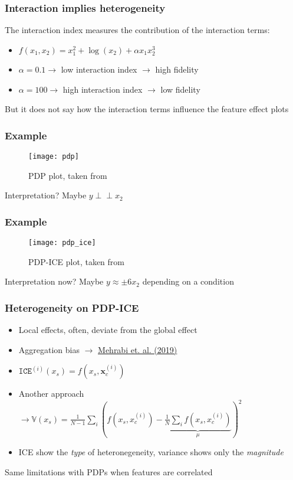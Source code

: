 \begin{frame}
  \frametitle{Interaction implies heterogeneity}
  The interaction index measures the contribution of the interaction terms:

  \begin{itemize}
    \item \(f(x_1, x_2) = x_1^2 + \log(x_2) + \alpha x_1x_2^3\)
    \item \(\alpha = 0.1 \rightarrow\) low interaction index \(\rightarrow\) high fidelity
    \item \(\alpha = 100 \rightarrow\) high interaction index \(\rightarrow\) low fidelity
    \end{itemize}
  \noindent\makebox[\linewidth]{\rule{\paperwidth}{0.4pt}}
  But it does not say how the interaction terms influence the feature effect plots
\end{frame}


\begin{frame}
  \frametitle{Example}
  \begin{figure}
    \centering
    \texttt{[image: pdp]}
    \caption{PDP plot, taken from }
  \end{figure}
  \noindent\makebox[\linewidth]{\rule{\paperwidth}{0.4pt}}
  Interpretation?
  Maybe $y \perp\!\!\!\!\perp x_2$
\end{frame}

\begin{frame}
  \frametitle{Example}
  \begin{figure}
    \centering
    \texttt{[image: pdp\_ice]}
    \caption{PDP-ICE plot, taken from }
  \end{figure}
  \noindent\makebox[\linewidth]{\rule{\paperwidth}{0.4pt}}
  Interpretation now? Maybe $y \approx \pm 6 x_2 $ depending on a condition
\end{frame}

\begin{frame}
  \frametitle{Heterogeneity on PDP-ICE}
  \begin{itemize}
    \item Local effects, often, deviate from the global effect
    \item Aggregation bias $\rightarrow$ \href{https://arxiv.org/pdf/1908.09635.pdf}{Mehrabi et. al. (2019)}
    \item $\mathtt{ICE}^{(i)}(x_s) = f(x_s, \mathbf{x}_c^{(i)})$
    \item Another approach $\rightarrow \mathbb{V}(x_s) = \frac{1}{N-1}\sum_i \left ( f(x_s, x_c^{(i)}) - \underbrace{\frac{1}{N} \sum_i f(x_s, x_c^{(i)})}_{\mu} \right)^2$
    \item ICE show the \emph{type} of heteronegeneity, variance shows only the \emph{magnitude}
  \end{itemize}
  \noindent\makebox[\linewidth]{\rule{\paperwidth}{0.4pt}}
  Same limitations with PDPs when features are correlated
\end{frame}

